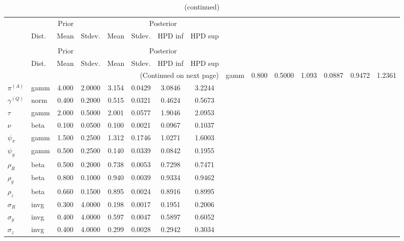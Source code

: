  
\begin{center}
\begin{longtable}{llcccccc} 
\caption{Results from Metropolis-Hastings (parameters)}
 \label{Table:MHPosterior:1}\\
\toprule 
  & \multicolumn{3}{c}{Prior}  &  \multicolumn{4}{c}{Posterior} \\
  \cmidrule(r{.75em}){2-4} \cmidrule(r{.75em}){5-8}
  & Dist. & Mean  & Stdev. & Mean & Stdev. & HPD inf & HPD sup\\
\midrule \endfirsthead 
\caption{(continued)}\\\toprule 
  & \multicolumn{3}{c}{Prior}  &  \multicolumn{4}{c}{Posterior} \\
  \cmidrule(r{.75em}){2-4} \cmidrule(r{.75em}){5-8}
  & Dist. & Mean  & Stdev. & Mean & Stdev. & HPD inf & HPD sup\\
\midrule \endhead 
\bottomrule \multicolumn{8}{r}{(Continued on next page)} \endfoot 
\bottomrule \endlastfoot 
${r_{A}}$ & gamm &   0.800 & 0.5000 &   1.093& 0.0887 &  0.9472 &  1.2361 \\ 
${\pi^{(A)}}$ & gamm &   4.000 & 2.0000 &   3.154& 0.0429 &  3.0846 &  3.2244 \\ 
${\gamma^{(Q)}}$ & norm &   0.400 & 0.2000 &   0.515& 0.0321 &  0.4624 &  0.5673 \\ 
${\tau}$ & gamm &   2.000 & 0.5000 &   2.001& 0.0577 &  1.9046 &  2.0953 \\ 
${\nu}$ & beta &   0.100 & 0.0500 &   0.100& 0.0021 &  0.0967 &  0.1037 \\ 
${\psi_\pi}$ & gamm &   1.500 & 0.2500 &   1.312& 0.1746 &  1.0271 &  1.6003 \\ 
${\psi_y}$ & gamm &   0.500 & 0.2500 &   0.140& 0.0339 &  0.0842 &  0.1955 \\ 
${\rho_R}$ & beta &   0.500 & 0.2000 &   0.738& 0.0053 &  0.7298 &  0.7471 \\ 
${\rho_{g}}$ & beta &   0.800 & 0.1000 &   0.940& 0.0039 &  0.9334 &  0.9462 \\ 
${\rho_z}$ & beta &   0.660 & 0.1500 &   0.895& 0.0024 &  0.8916 &  0.8995 \\ 
${\sigma_R}$ & invg &   0.300 & 4.0000 &   0.198& 0.0017 &  0.1951 &  0.2006 \\ 
${\sigma_{g}}$ & invg &   0.400 & 4.0000 &   0.597& 0.0047 &  0.5897 &  0.6052 \\ 
${\sigma_z}$ & invg &   0.400 & 4.0000 &   0.299& 0.0028 &  0.2942 &  0.3034 \\ 
\end{longtable}
 \end{center}
